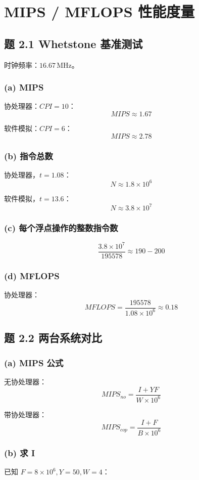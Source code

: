 \documentclass[12pt]{article}
\begin{document}
\section{MIPS / MFLOPS 性能度量}

\subsection{题 2.1 Whetstone 基准测试}

时钟频率：$16.67\,\text{MHz}$。

\subsubsection*{(a) MIPS}
协处理器：$CPI=10$：
\[
MIPS \approx 1.67
\]

软件模拟：$CPI=6$：
\[
MIPS \approx 2.78
\]

\subsubsection*{(b) 指令总数}
协处理器，$t=1.08$：
\[
N\approx 1.8\times 10^6
\]

软件模拟，$t=13.6$：
\[
N\approx 3.8\times 10^7
\]

\subsubsection*{(c) 每个浮点操作的整数指令数}
\[
\frac{3.8\times10^7}{195578} \approx 190-200
\]

\subsubsection*{(d) MFLOPS}
协处理器：
\[
MFLOPS = \frac{195578}{1.08\times 10^6} \approx 0.18
\]


\subsection{题 2.2 两台系统对比}

\subsubsection*{(a) MIPS 公式}
无协处理器：
\[
MIPS_{no} = \frac{I+YF}{W\times 10^6}
\]

带协处理器：
\[
MIPS_{cop} = \frac{I+F}{B\times 10^6}
\]

\subsubsection*{(b) 求 I}
已知 $F=8\times10^6, Y=50, W=4$：
\end{document}
